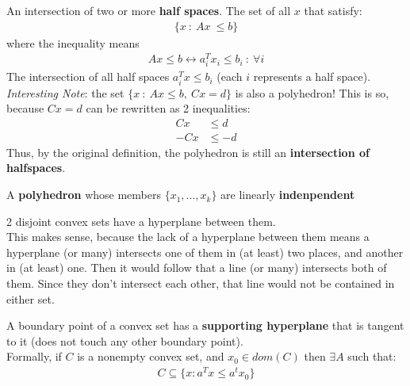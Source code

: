 \documentclass{article}
\begin{document}
\begin{definition}[Polyhedron]
  An intersection of two or more \textbf{half spaces}.  The set of all $x$ that
  satisfy:
  \begin{align}
    \{x~:~Ax~\leq b\}
  \end{align}
  where the inequality means
  \begin{align}
    Ax\leq b \longleftrightarrow a_i^Tx_i\leq b_i~:~\forall i
  \end{align}
  The intersection of all half spaces $a_i^Tx\leq b_i$ (each $i$ represents a half space).\\
  \vpush
  \textit{Interesting Note}: the set $\{x~:~Ax\leq b,~Cx=d\}$ is also a polyhedron!
  This is so, because $Cx=d$ can be rewritten as 2 inequalities:
  \begin{align}
    \nonumber
    Cx  & \leq d  \\
    -Cx & \leq -d
  \end{align}
  Thus, by the original definition, the polyhedron is still an \textbf{intersection of halfspaces}.
\end{definition}
\begin{definition}[Simplex]
  A \textbf{polyhedron} whose members $\{x_1,...,x_k\}$ are linearly \textbf{indenpendent}
\end{definition}
\begin{theorem}
  2 disjoint convex sets have a hyperplane between them.\\
  \vpush
  This makes sense, because the lack of a hyperplane between them means
  a hyperplane (or many) intersects one of them in (at least) two places, and
  another in (at least) one.  Then it would follow that
  a line (or many) intersects both of them.  Since they don't intersect each other,
  that line would not be contained in either set.
\end{theorem}
\begin{theorem}
  A boundary point of a convex set has a \textbf{supporting hyperplane}
  that is tangent to it (does not touch any other boundary point).\\
  \vpush
  Formally, if $C$ is a nonempty convex set, and $x_0\in dom(C)$ then
  $\exists A$ such that:
  \begin{align}
    C\subseteq \{x:a^Tx\leq a^tx_0\}
  \end{align}
\end{theorem}
\pagebreak
\end{document}
